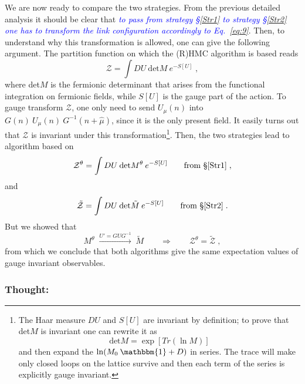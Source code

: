 \documentclass[a4paper,10pt]{article}
\newcommand{\Eq}[1]{Eq.~\eqref{eq:#1}}
\begin{document}
We are now ready to compare the two strategies. From the previous detailed analysis it should
be clear that \textcolor{blue}{\emph{to pass from strategy §\ref{Str1} to strategy §\ref{Str2}
one has to transform the link configuration accordingly to \Eq{9}}}. Then, to understand
why this transformation is allowed, one can give the following argument. The partition
function on which the (R)HMC algorithm is based reads
\begin{equation}\label{eq:12}
 \mathcal{Z}=\int DU \:\text{det}M\: e^{-S[U]}\;,
\end{equation}
where det$M$ is the fermionic determinant that arises from the functional integration on fermionic
fields, while $S[U]$ is the gauge part of the action. To gauge transform $\mathcal{Z}$, one only
need to send $U_\mu(n)$ into $G(n)\:U_\mu(n)\:G^{-1}(n+\hat\mu)$, since it is the only present field.
It easily turns out that $\mathcal{Z}$ is invariant under this transformation\footnote{The Haar measure
$DU$ and $S[U]$ are invariant by definition; to prove that det$M$ is invariant one can rewrite it as
\[
 \text{det}M=\exp[Tr(\ln M)]
\]
and then expand the $\ln(M_0\:\mathbbm{1}+D)$ in series. The trace will make
only closed loops on the lattice survive and then each term of the series is explicitly gauge invariant.}.
Then, the two strategies lead to algorithm based on
\[
 \mathcal{Z}^\theta=\int DU \:\text{det}M^\theta\: e^{-S[U]}\qquad \text{from §\ref{Str1}}\;,
\]
and
\[
 \tilde{\mathcal{Z}}=\int DU \:\text{det}\tilde{M}\: e^{-S[U]}\qquad \text{from §\ref{Str2}}\;.
\]
But we showed that
\[
 M^\theta\;\xrightarrow{U'=GUG^{-1}}\;\tilde{M}\qquad\Rightarrow\qquad \mathcal{Z}^\theta=\tilde{\mathcal{Z}}\;,
\]
from which we conclude that both algorithms give the same expectation values of gauge invariant observables.










\color{OliveGreen}
\subsubsection*{Thought:}
\end{document}
